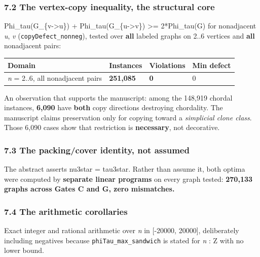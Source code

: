 \documentclass[
  9pt,
  a4paper,
]{article}
\newcounter{none} %
\begin{document}
\subsubsection{7.2 The vertex-copy inequality, the structural
core}\label{72-the-vertex-copy-inequality-the-structural-core}

Phi\_tau(G\_\{v-\textgreater u\}) + Phi\_tau(G\_\{u-\textgreater v\})
\textgreater= 2*Phi\_tau(G) for nonadjacent \emph{u}, \emph{v}
(\texttt{copyDefect\_nonneg}), tested over \textbf{all} labeled graphs
on 2..6 vertices and \textbf{all} nonadjacent pairs:

{\def\LTcaptype{none} %
\begin{longtable}[]{@{}llll@{}}
\toprule\noalign{}
Domain & Instances & Violations & Min defect \\
\midrule\noalign{}
\endhead
\bottomrule\noalign{}
\endlastfoot
\emph{n} = 2..6, all nonadjacent pairs & \textbf{251,085} & \textbf{0} &
0 \\
\end{longtable}
}

An observation that supports the manuscript: among the 148,919 chordal
instances, \textbf{6,090} have \textbf{both} copy directions destroying
chordality. The manuscript claims preservation only for copying toward a
\emph{simplicial clone class}. Those 6,090 cases show that restriction
is \textbf{necessary}, not decorative.

\subsubsection{7.3 The packing/cover identity, not
assumed}\label{73-the-packingcover-identity-not-assumed}

The abstract asserts nu3star = tau3star. Rather than assume it, both
optima were computed by \textbf{separate linear programs} on every graph
tested: \textbf{270,133 graphs across Gates C and G, zero mismatches.}

\subsubsection{7.4 The arithmetic
corollaries}\label{74-the-arithmetic-corollaries}

Exact integer and rational arithmetic over \emph{n} in {[}-20000,
20000{]}, deliberately including negatives because
\texttt{phiTau\_max\_sandwich} is stated for \emph{n} : Z with no lower
bound.
\end{document}
